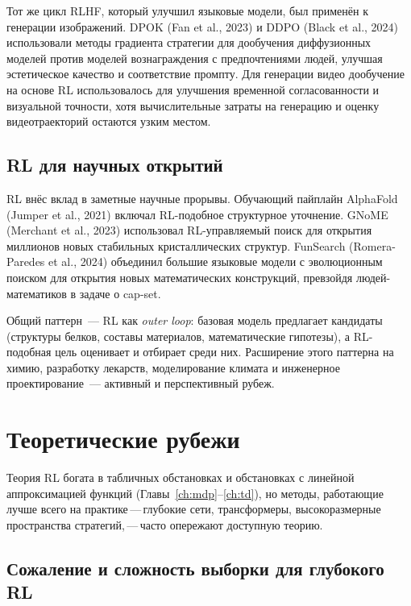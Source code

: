 Тот же цикл RLHF, который улучшил языковые модели, был применён к
генерации изображений. DPOK (Fan et al., 2023) и DDPO (Black et al.,
2024) использовали методы градиента стратегии для дообучения диффузионных моделей
против моделей вознаграждения с предпочтениями людей, улучшая эстетическое качество и
соответствие промпту. Для генерации видео дообучение на основе RL использовалось
для улучшения временной согласованности и визуальной точности, хотя
вычислительные затраты на генерацию и оценку видеотраекторий остаются
узким местом.

\subsection{RL для научных открытий}

RL внёс вклад в заметные научные прорывы. Обучающий пайплайн AlphaFold
(Jumper et al., 2021) включал RL-подобное структурное уточнение. GNoME (Merchant et al., 2023) использовал RL-управляемый
поиск для открытия миллионов новых стабильных кристаллических структур.
FunSearch (Romera-Paredes et al., 2024) объединил большие языковые модели
с эволюционным поиском для открытия новых математических конструкций,
превзойдя людей-математиков в задаче о cap-set.

Общий паттерн~--- RL как \emph{outer loop}: базовая модель
предлагает кандидаты (структуры белков, составы материалов,
математические гипотезы), а RL-подобная цель оценивает и отбирает
среди них. Расширение этого паттерна на химию, разработку лекарств,
моделирование климата и инженерное проектирование~--- активный и
перспективный рубеж.


\section{Теоретические рубежи}
\label{sec:open-theory}

Теория RL богата в табличных обстановках и обстановках с линейной аппроксимацией функций
(Главы~\ref{ch:mdp}--\ref{ch:td}), но методы, работающие
лучше всего на практике\,---\,глубокие сети, трансформеры, высокоразмерные
пространства стратегий,\,---\,часто опережают доступную теорию.

\subsection{Сожаление и сложность выборки для глубокого RL}

